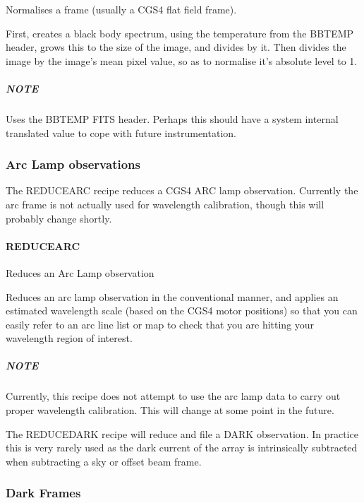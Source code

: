 \documentclass[twoside,11pt]{article}
\renewcommand{\_}{\texttt{\symbol{95}}}
\begin{document}
\mbox{}


Normalises a frame (usually a CGS4 flat field frame).



First, creates a black body spectrum, using the temperature from the
BBTEMP header, grows this to the size of the image, and divides by
it. Then divides the image by the image's mean pixel value, so as to
normalise it's absolute level to 1.

\subparagraph*{NOTE\label{_NORMALISE_FLAT_BY_BB__NOTE}}


Uses the BBTEMP FITS header. Perhaps this should have a system internal
translated value to cope with future instrumentation.


\subsubsection{Arc Lamp observations}

The REDUCE\_ARC recipe reduces a CGS4 ARC lamp observation. Currently
the arc frame is not actually used for wavelength calibration, though
this will probably change shortly.

\paragraph{REDUCE\_ARC\label{REDUCE_ARC}}


Reduces an Arc Lamp observation


\mbox{}


Reduces an arc lamp observation in the conventional manner, and
applies an estimated wavelength scale (based on the CGS4 motor
positions) so that you can easily refer to an arc line list or map to
check that you are hitting your wavelength region of interest.

\subparagraph*{NOTE\label{REDUCE_ARC_NOTE}}


Currently, this recipe does not attempt to use the arc lamp data to
carry out proper wavelength calibration. This will change at some
point in the future.


The REDUCE\_DARK recipe will reduce and file a DARK observation. In
practice this is very rarely used as the dark current of the array is
intrinsically subtracted when subtracting a sky or offset beam frame.

\subsubsection{Dark Frames}
\end{document}
